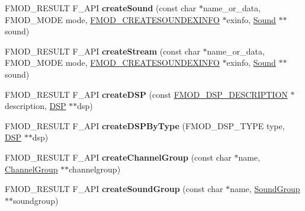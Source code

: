 \begin{DoxyCompactItemize}
\item 
\hypertarget{class_f_m_o_d_1_1_system_aca0782c1d367a54ddf00aea484971735}{F\+M\+O\+D\+\_\+\+R\+E\+S\+U\+L\+T F\+\_\+\+A\+P\+I {\bfseries create\+Sound} (const char $\ast$name\+\_\+or\+\_\+data, F\+M\+O\+D\+\_\+\+M\+O\+D\+E mode, \hyperlink{struct_f_m_o_d___c_r_e_a_t_e_s_o_u_n_d_e_x_i_n_f_o}{F\+M\+O\+D\+\_\+\+C\+R\+E\+A\+T\+E\+S\+O\+U\+N\+D\+E\+X\+I\+N\+F\+O} $\ast$exinfo, \hyperlink{class_f_m_o_d_1_1_sound}{Sound} $\ast$$\ast$sound)}\label{class_f_m_o_d_1_1_system_aca0782c1d367a54ddf00aea484971735}

\item 
\hypertarget{class_f_m_o_d_1_1_system_accec6ee2c51fccf5091098658b65491c}{F\+M\+O\+D\+\_\+\+R\+E\+S\+U\+L\+T F\+\_\+\+A\+P\+I {\bfseries create\+Stream} (const char $\ast$name\+\_\+or\+\_\+data, F\+M\+O\+D\+\_\+\+M\+O\+D\+E mode, \hyperlink{struct_f_m_o_d___c_r_e_a_t_e_s_o_u_n_d_e_x_i_n_f_o}{F\+M\+O\+D\+\_\+\+C\+R\+E\+A\+T\+E\+S\+O\+U\+N\+D\+E\+X\+I\+N\+F\+O} $\ast$exinfo, \hyperlink{class_f_m_o_d_1_1_sound}{Sound} $\ast$$\ast$sound)}\label{class_f_m_o_d_1_1_system_accec6ee2c51fccf5091098658b65491c}

\item 
\hypertarget{class_f_m_o_d_1_1_system_a0b150ee5db127c245ae98285d2713326}{F\+M\+O\+D\+\_\+\+R\+E\+S\+U\+L\+T F\+\_\+\+A\+P\+I {\bfseries create\+D\+S\+P} (const \hyperlink{struct_f_m_o_d___d_s_p___d_e_s_c_r_i_p_t_i_o_n}{F\+M\+O\+D\+\_\+\+D\+S\+P\+\_\+\+D\+E\+S\+C\+R\+I\+P\+T\+I\+O\+N} $\ast$description, \hyperlink{class_f_m_o_d_1_1_d_s_p}{D\+S\+P} $\ast$$\ast$dsp)}\label{class_f_m_o_d_1_1_system_a0b150ee5db127c245ae98285d2713326}

\item 
\hypertarget{class_f_m_o_d_1_1_system_ab3a4c98eb70da7e96866b0f40f5cbd22}{F\+M\+O\+D\+\_\+\+R\+E\+S\+U\+L\+T F\+\_\+\+A\+P\+I {\bfseries create\+D\+S\+P\+By\+Type} (F\+M\+O\+D\+\_\+\+D\+S\+P\+\_\+\+T\+Y\+P\+E type, \hyperlink{class_f_m_o_d_1_1_d_s_p}{D\+S\+P} $\ast$$\ast$dsp)}\label{class_f_m_o_d_1_1_system_ab3a4c98eb70da7e96866b0f40f5cbd22}

\item 
\hypertarget{class_f_m_o_d_1_1_system_af4d7063579a60c8986eb8bb1f67e7f2c}{F\+M\+O\+D\+\_\+\+R\+E\+S\+U\+L\+T F\+\_\+\+A\+P\+I {\bfseries create\+Channel\+Group} (const char $\ast$name, \hyperlink{class_f_m_o_d_1_1_channel_group}{Channel\+Group} $\ast$$\ast$channelgroup)}\label{class_f_m_o_d_1_1_system_af4d7063579a60c8986eb8bb1f67e7f2c}

\item 
\hypertarget{class_f_m_o_d_1_1_system_adac6229aff0ac7480c50988d753df46f}{F\+M\+O\+D\+\_\+\+R\+E\+S\+U\+L\+T F\+\_\+\+A\+P\+I {\bfseries create\+Sound\+Group} (const char $\ast$name, \hyperlink{class_f_m_o_d_1_1_sound_group}{Sound\+Group} $\ast$$\ast$soundgroup)}\label{class_f_m_o_d_1_1_system_adac6229aff0ac7480c50988d753df46f}


\end{DoxyCompactItemize}
